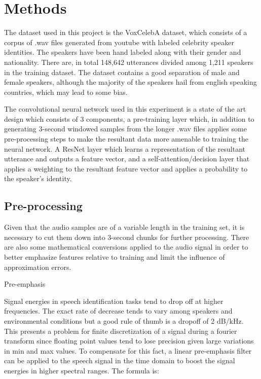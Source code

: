 %
%
\chapter{Methods}
\label{cha:methods}
The dataset used in this project is the VoxCelebA dataset, which consists of a corpus of .wav files generated from youtube with labeled celebrity speaker identities. The speakers have been hand labeled along with their gender and nationality. There are, in total 148,642 utterances divided among 1,211 speakers in the training dataset. The dataset contains a good separation of male and female speakers, although the majority of the speakers hail from english speaking countries, which may lead to some bias.

The convolutional neural network used in this experiment is a state of the art design which consists of 3 components, a pre-training layer which, in addition to generating 3-second windowed samples from the longer .wav files applies some pre-processing steps to make the resultant data more amenable to training the neural network. A ResNet layer which learns a representation of the resultant utterance and outputs a feature vector, and a self-attention/decision layer that applies a weighting to the resultant feature vector and applies a probability to the speaker's identity.

\section{Pre-processing}
\label{cha:methods/pre-processing}
Given that the audio samples are of a variable length in the training set, it is necessary to cut them down into 3-second chunks for further processing. There are also some mathematical conversions applied to the audio signal in order to better emphasize features relative to training and limit the influence of approximation errors. 

Pre-emphasis

Signal energies in speech identification tasks tend to drop off at higher frequencies. The exact rate of decrease tends to vary among speakers and environmental conditions but a good rule of thumb is a dropoff of 2 dB/kHz. This presents a problem for finite discretization of a signal during a fourier transform since floating point values tend to lose precision given large variations in min and max values. To compensate for this fact, a linear pre-emphasis filter can be applied to the speech signal in the time domain to boost the signal energies in higher spectral ranges. The formula is:


